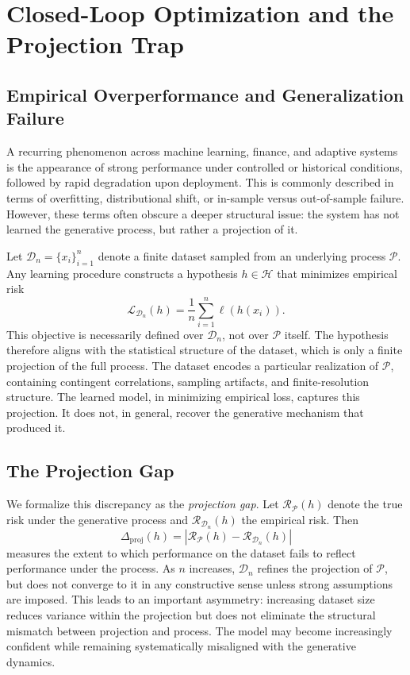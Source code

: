 \documentclass[12pt]{article}
\theoremstyle{plain}
\theoremstyle{definition}
\theoremstyle{remark}
\begin{document}
\section{Closed-Loop Optimization and the Projection Trap}

\subsection{Empirical Overperformance and Generalization Failure}

A recurring phenomenon across machine learning, finance, and adaptive systems is the appearance of strong performance under controlled or historical conditions, followed by rapid degradation upon deployment. This is commonly described in terms of overfitting, distributional shift, or in-sample versus out-of-sample failure. However, these terms often obscure a deeper structural issue: the system has not learned the generative process, but rather a projection of it.

Let $\mathcal{D}_n = \{x_i\}_{i=1}^n$ denote a finite dataset sampled from an underlying process $\mathcal{P}$. Any learning procedure constructs a hypothesis $h \in \mathcal{H}$ that minimizes empirical risk
\[
\mathcal{L}_{\mathcal{D}_n}(h) = \frac{1}{n} \sum_{i=1}^n \ell(h(x_i)).
\]
This objective is necessarily defined over $\mathcal{D}_n$, not over $\mathcal{P}$ itself. The hypothesis therefore aligns with the statistical structure of the dataset, which is only a finite projection of the full process. The dataset encodes a particular realization of $\mathcal{P}$, containing contingent correlations, sampling artifacts, and finite-resolution structure. The learned model, in minimizing empirical loss, captures this projection. It does not, in general, recover the generative mechanism that produced it.

\subsection{The Projection Gap}

We formalize this discrepancy as the \emph{projection gap}. Let $\mathcal{R}_{\mathcal{P}}(h)$ denote the true risk under the generative process and $\mathcal{R}_{\mathcal{D}_n}(h)$ the empirical risk. Then
\[
\Delta_{\mathrm{proj}}(h) = \left| \mathcal{R}_{\mathcal{P}}(h) - \mathcal{R}_{\mathcal{D}_n}(h) \right|
\]
measures the extent to which performance on the dataset fails to reflect performance under the process. As $n$ increases, $\mathcal{D}_n$ refines the projection of $\mathcal{P}$, but does not converge to it in any constructive sense unless strong assumptions are imposed. This leads to an important asymmetry: increasing dataset size reduces variance within the projection but does not eliminate the structural mismatch between projection and process. The model may become increasingly confident while remaining systematically misaligned with the generative dynamics.
\end{document}
